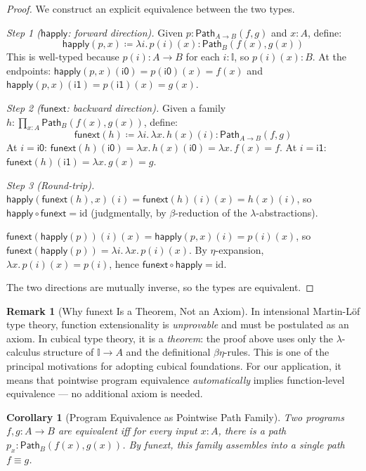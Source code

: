 \documentclass[11pt,a4paper]{report}
\theoremstyle{definition}
\newtheorem{remark}[definition]{Remark}
\theoremstyle{plain}
\newtheorem{corollary}[definition]{Corollary}
\newcommand{\Path}{\mathsf{Path}}
\newcommand{\interval}{\mathbb{I}}
\begin{document}
\begin{proof}
We construct an explicit equivalence between the two types.

\emph{Step 1 ($\mathsf{happly}$: forward direction).}
Given $p : \Path_{A \to B}(f, g)$ and $x : A$, define:
\[
  \mathsf{happly}(p, x) \coloneqq \lambda i.\, p(i)(x) : \Path_B(f(x), g(x))
\]
This is well-typed because $p(i) : A \to B$ for each $i : \interval$,
so $p(i)(x) : B$.  At the endpoints:
$\mathsf{happly}(p, x)(\mathsf{i0}) = p(\mathsf{i0})(x) = f(x)$ and
$\mathsf{happly}(p, x)(\mathsf{i1}) = p(\mathsf{i1})(x) = g(x)$.

\emph{Step 2 ($\mathsf{funext}$: backward direction).}
Given a family $h : \prod_{x : A} \Path_B(f(x), g(x))$, define:
\[
  \mathsf{funext}(h) \coloneqq \lambda i.\, \lambda x.\, h(x)(i)
  : \Path_{A \to B}(f, g)
\]
At $i = \mathsf{i0}$: $\mathsf{funext}(h)(\mathsf{i0}) = \lambda x.\,
h(x)(\mathsf{i0}) = \lambda x.\, f(x) = f$.
At $i = \mathsf{i1}$: $\mathsf{funext}(h)(\mathsf{i1}) = \lambda x.\,
g(x) = g$.

\emph{Step 3 (Round-trip).}
$\mathsf{happly}(\mathsf{funext}(h), x)(i) = \mathsf{funext}(h)(i)(x)
= h(x)(i)$, so $\mathsf{happly} \circ \mathsf{funext} = \mathrm{id}$
(judgmentally, by $\beta$-reduction of the $\lambda$-abstractions).

$\mathsf{funext}(\mathsf{happly}(p))(i)(x) = \mathsf{happly}(p, x)(i)
= p(i)(x)$, so $\mathsf{funext}(\mathsf{happly}(p)) = \lambda i.\,
\lambda x.\, p(i)(x)$.  By $\eta$-expansion, $\lambda x.\, p(i)(x) =
p(i)$, hence $\mathsf{funext} \circ \mathsf{happly} = \mathrm{id}$.

The two directions are mutually inverse, so the types are equivalent.
\end{proof}

\begin{remark}[Why funext Is a Theorem, Not an Axiom]
In intensional Martin-L\"of type theory, function extensionality is
\emph{unprovable} and must be postulated as an axiom.  In cubical type
theory, it is a \emph{theorem}: the proof above uses only the
$\lambda$-calculus structure of $\interval \to A$ and the definitional
$\beta\eta$-rules.  This is one of the principal motivations for
adopting cubical foundations.  For our application, it means that
pointwise program equivalence \emph{automatically} implies function-level
equivalence --- no additional axiom is needed.
\end{remark}

\begin{corollary}[Program Equivalence as Pointwise Path Family]
\label{cor:prog-equiv}
Two programs $f, g : A \to B$ are equivalent iff for every input
$x : A$, there is a path $p_x : \Path_B(f(x), g(x))$.  By funext,
this family assembles into a single path $f \equiv g$.
\end{corollary}
\end{document}
